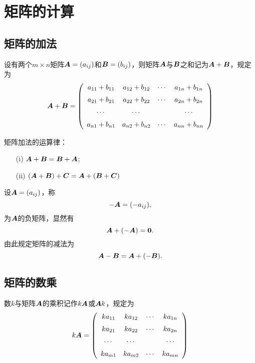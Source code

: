 \section{矩阵的计算}
\subsection{矩阵的加法}
\begin{dingyi}[矩阵的加法]
  设有两个$m\times n$矩阵$\boldsymbol{A}=(a_{ij})$和$\boldsymbol{B}=(b_{ij})$，则矩阵$\boldsymbol{A}$与$\boldsymbol{B}$之和记为$\boldsymbol{A}+\boldsymbol{B}$，规定为
  $$
  \boldsymbol{A} + \boldsymbol{B} = 
  \left(
    \begin{array}{cccc}
      a_{11} + b_{11}  & a_{12} + b_{12}  & \cdots & a_{1n} + b_{1n}  \\[0.2cm]
      a_{21} + b_{21}  & a_{22} + b_{22}  & \cdots & a_{2n} + b_{2n}  \\[0.2cm]
      \cdots            & \cdots            &     & \cdots            \\[0.2cm]
      a_{n1} + b_{n1}  & a_{n2} + b_{n2}  & \cdots & a_{nn} + b_{nn}  
    \end{array}
  \right)
  $$
\end{dingyi}

\begin{zhu}
\end{zhu}

矩阵加法的运算律：
\begin{itemize}
\item[(i)] $\boldsymbol{A} + \boldsymbol{B} = \boldsymbol{B} + \boldsymbol{A}$;
\item[(ii)] $(\boldsymbol{A} + \boldsymbol{B}) + \boldsymbol{C} = \boldsymbol{A} + (\boldsymbol{B} + \boldsymbol{C})$ 
\end{itemize}

设$\boldsymbol{A} = (a_{ij})$，称
$$
-\boldsymbol{A} = (-a_{ij}),
$$
为$\boldsymbol{A}$的负矩阵，显然有
$$
\boldsymbol{A} + (-\boldsymbol{A}) = \mathbf{0}.
$$
由此规定矩阵的减法为
$$
\boldsymbol{A} - \boldsymbol{B} = \boldsymbol{A} + (-\boldsymbol{B}).
$$

\subsection{矩阵的数乘}

% 
\begin{dingyi}[矩阵的数乘]
  数$k$与矩阵$\boldsymbol{A}$的乘积记作$k \boldsymbol{A}$或$\boldsymbol{A} k$，规定为
  $$
  k \boldsymbol{A} = 
  \left(
    \begin{array}{cccc}
      k a_{11}   & k a_{12}   & \cdots & k a_{1n}  \\[0.2cm]
      k a_{21}   & k a_{22}   & \cdots & k a_{2n}  \\[0.2cm]
      \cdots     & \cdots     &     & \cdots    \\[0.2cm]
      k a_{m1}   & k a_{m2}   & \cdots & k a_{mn}  
    \end{array}
  \right)
  $$
\end{dingyi}

